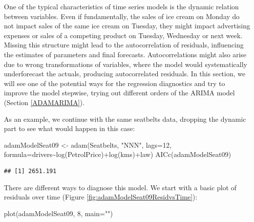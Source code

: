 \documentclass[
]{book}
\newenvironment{Shaded}{\begin{snugshade}}{\end{snugshade}}
\newcommand{\AttributeTok}[1]{\textcolor[rgb]{0.77,0.63,0.00}{#1}}
\newcommand{\DecValTok}[1]{\textcolor[rgb]{0.00,0.00,0.81}{#1}}
\newcommand{\FunctionTok}[1]{\textcolor[rgb]{0.00,0.00,0.00}{#1}}
\newcommand{\NormalTok}[1]{#1}
\newcommand{\OtherTok}[1]{\textcolor[rgb]{0.56,0.35,0.01}{#1}}
\newcommand{\SpecialCharTok}[1]{\textcolor[rgb]{0.00,0.00,0.00}{#1}}
\newcommand{\StringTok}[1]{\textcolor[rgb]{0.31,0.60,0.02}{#1}}
\theoremstyle{definition}
\theoremstyle{definition}
\theoremstyle{definition}
\theoremstyle{definition}
\theoremstyle{remark}
\begin{document}
One of the typical characteristics of time series models is the dynamic relation between variables. Even if fundamentally, the sales of ice cream on Monday do not impact sales of the same ice cream on Tuesday, they might impact advertising expenses or sales of a competing product on Tuesday, Wednesday or next week. Missing this structure might lead to the autocorrelation of residuals, influencing the estimates of parameters and final forecasts. Autocorrelations might also arise due to wrong transformations of variables, where the model would systematically underforecast the actuals, producing autocorrelated residuals. In this section, we will see one of the potential ways for the regression diagnostics and try to improve the model stepwise, trying out different orders of the ARIMA model (Section \ref{ADAMARIMA}).

As an example, we continue with the same seatbelts data, dropping the dynamic part to see what would happen in this case:

\begin{Shaded}
\begin{Highlighting}[]
\NormalTok{adamModelSeat09 }\OtherTok{\textless{}{-}} \FunctionTok{adam}\NormalTok{(Seatbelts, }\StringTok{"NNN"}\NormalTok{, }\AttributeTok{lags=}\DecValTok{12}\NormalTok{,}
                        \AttributeTok{formula=}\NormalTok{drivers}\SpecialCharTok{\textasciitilde{}}\FunctionTok{log}\NormalTok{(PetrolPrice)}\SpecialCharTok{+}\FunctionTok{log}\NormalTok{(kms)}\SpecialCharTok{+}\NormalTok{law)}
\FunctionTok{AICc}\NormalTok{(adamModelSeat09)}
\end{Highlighting}
\end{Shaded}

\begin{verbatim}
## [1] 2651.191
\end{verbatim}

There are different ways to diagnose this model. We start with a basic plot of residuals over time (Figure \ref{fig:adamModelSeat09ResidvsTime}):

\begin{Shaded}
\begin{Highlighting}[]
\FunctionTok{plot}\NormalTok{(adamModelSeat09, }\DecValTok{8}\NormalTok{, }\AttributeTok{main=}\StringTok{""}\NormalTok{)}
\end{Highlighting}
\end{Shaded}
\end{document}
